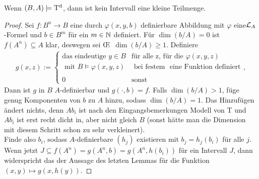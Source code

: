 \begin{theorem}
	Wenn $(B,A)\models\operatorname{T^d}$, dann ist kein Intervall eine kleine Teilmenge.
\end{theorem}
\begin{proof}
	Sei $f:B^n\rightarrow B$ eine durch $\varphi(x,y,b)$ definierbare Abbildung mit $\varphi$ eine\linebreak$\mathcal{L}_A$-Formel und $b\in B^m$ für ein $m\in\mathbb{N}$ definiert. Für $\dim(b/A)=0$ ist $f(A^n)\subseteq A$ klar, deswegen sei \OE\ $\dim(b/A)\geq1$. Definiere
	\begin{align*}
	g(x,z):=\left\{\begin{array}{ll}
	\text{das eindeutige }y\in B &\text{für alle z, für die }\varphi(x,y,z)\\
	\text{ mit }B\models\varphi(x,y,z) &\text{ bei festem }\text{ eine Funktion definiert}\\
	\ &\ \\
	0 &\text{sonst}
	\end{array}\right.,
	\end{align*}
	Dann ist $g$ in $B$ $A$-definierbar und $g(\cdot,b)=f$. Falls $\dim(b/A)>1$, füge genug Komponenten von $b$ zu $A$ hinzu, sodass $\dim(b/A)=1$. Das Hinzufügen ändert nichts, denn $Ab_i$ ist nach den Eingangsbemerkungen Modell von T und $Ab_i$ ist erst recht dicht in, aber nicht gleich $B$ (sonst hätte man die Dimension mit diesem Schritt schon zu sehr verkleinert).\\
	Finde also $b_i$, sodass $A$-definierbare $(h_j)$ existieren mit $b_j=h_j(b_i)$ für alle $j$. Wenn jetzt $J\subseteq f(A^n)=g(A^n,b)=g(A^n,h(b_i))$ für ein Intervall $J$, dann widerspricht das der Aussage des letzten Lemmas für die Funktion $(x,y)\mapsto g(x,h(y))$.
\end{proof}


